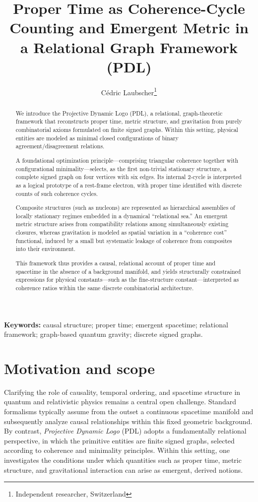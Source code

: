 \documentclass[11pt,a4paper]{article}
\title{Proper Time as Coherence-Cycle Counting and Emergent Metric in a Relational Graph Framework (PDL)}
\author{Cédric Laubscher\footnote{Independent researcher, Switzerland}}
\date{}
\begin{document}
\maketitle

\begin{abstract}
We introduce the Projective Dynamic Logo (PDL), a relational, graph-theoretic framework that reconstructs proper time, metric structure, and gravitation from purely combinatorial axioms formulated on finite signed graphs. Within this setting, physical entities are modeled as minimal closed configurations of binary agreement/disagreement relations.

A foundational optimization principle—comprising triangular coherence together with configurational minimality—selects, as the first non-trivial stationary structure, a complete signed graph on four vertices with six edges. Its internal 2-cycle is interpreted as a logical prototype of a rest-frame electron, with proper time identified with discrete counts of such coherence cycles.

Composite structures (such as nucleons) are represented as hierarchical assemblies of locally stationary regimes embedded in a dynamical “relational sea.” An emergent metric structure arises from compatibility relations among simultaneously existing closures, whereas gravitation is modeled as spatial variation in a “coherence cost” functional, induced by a small but systematic leakage of coherence from composites into their environment.

This framework thus provides a causal, relational account of proper time and spacetime in the absence of a background manifold, and yields structurally constrained expressions for physical constants—such as the fine-structure constant—interpreted as coherence ratios within the same discrete combinatorial architecture.

\end{abstract}

\noindent\textbf{Keywords:} causal structure; proper time; emergent spacetime; relational framework; graph-based quantum gravity; discrete signed graphs.

\section{Motivation and scope}

Clarifying the role of causality, temporal ordering, and spacetime structure in quantum and relativistic physics remains a central open challenge. Standard formalisms typically assume from the outset a continuous spacetime manifold and subsequently analyze causal relationships within this fixed geometric background. By contrast, \emph{Projective Dynamic Logo} (PDL) adopts a fundamentally relational perspective, in which the primitive entities are finite signed graphs, selected according to coherence and minimality principles. Within this setting, one investigates the conditions under which quantities such as proper time, metric structure, and gravitational interaction can arise as emergent, derived notions.
\end{document}
